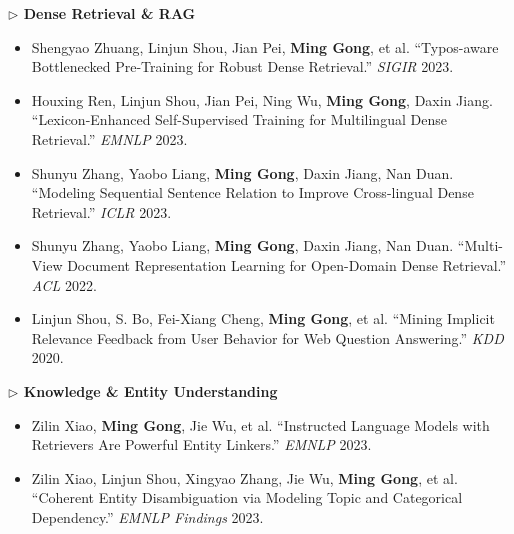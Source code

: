 \documentclass[10.5pt,letterpaper]{article}
\begin{document}
\noindent\textcolor{accent}{\textbf{$\triangleright$ Dense Retrieval \& RAG}}
\begin{itemize}
  \item Shengyao Zhuang, Linjun Shou, Jian Pei, \textbf{Ming Gong}, et al. ``Typos-aware Bottlenecked Pre-Training for Robust Dense Retrieval.'' \textit{SIGIR} 2023.
  \item Houxing Ren, Linjun Shou, Jian Pei, Ning Wu, \textbf{Ming Gong}, Daxin Jiang. ``Lexicon-Enhanced Self-Supervised Training for Multilingual Dense Retrieval.'' \textit{EMNLP} 2023.
  \item Shunyu Zhang, Yaobo Liang, \textbf{Ming Gong}, Daxin Jiang, Nan Duan. ``Modeling Sequential Sentence Relation to Improve Cross-lingual Dense Retrieval.'' \textit{ICLR} 2023.
  \item Shunyu Zhang, Yaobo Liang, \textbf{Ming Gong}, Daxin Jiang, Nan Duan. ``Multi-View Document Representation Learning for Open-Domain Dense Retrieval.'' \textit{ACL} 2022.
  \item Linjun Shou, S. Bo, Fei-Xiang Cheng, \textbf{Ming Gong}, et al. ``Mining Implicit Relevance Feedback from User Behavior for Web Question Answering.'' \textit{KDD} 2020.
\end{itemize}

\noindent\textcolor{accent}{\textbf{$\triangleright$ Knowledge \& Entity Understanding}}
\begin{itemize}
  \item Zilin Xiao, \textbf{Ming Gong}, Jie Wu, et al. ``Instructed Language Models with Retrievers Are Powerful Entity Linkers.'' \textit{EMNLP} 2023.
  \item Zilin Xiao, Linjun Shou, Xingyao Zhang, Jie Wu, \textbf{Ming Gong}, et al. ``Coherent Entity Disambiguation via Modeling Topic and Categorical Dependency.'' \textit{EMNLP Findings} 2023.
\end{itemize}

\end{document}
